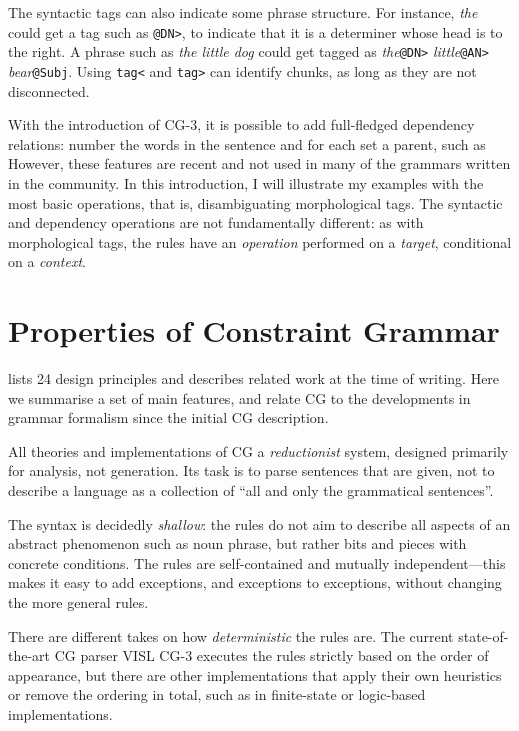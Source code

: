 The syntactic tags can also indicate some phrase structure. For
instance, \emph{the} could get a tag such as
\texttt{@DN\textgreater}, to indicate that it is a determiner whose
head is to the right. A phrase such as \emph{the little dog} could get
tagged as  \emph{the}\texttt{@DN>} \emph{little}\texttt{@AN>}
\emph{bear}\texttt{@Subj}.
 Using \texttt{tag\textless} and \texttt{tag\textgreater} can identify
chunks, as long as they are not disconnected.

With the introduction of CG-3, it is possible to add full-fledged dependency
relations: number the words in the sentence and for each set a parent,
such as %
However, these features are recent and not used in many of the grammars written 
in the community. In this introduction, I will illustrate my examples with the 
most basic operations, that is, disambiguating morphological tags.
The syntactic and dependency operations are not fundamentally
different: as with morphological tags, the rules have an \emph{operation}
performed on a \emph{target}, conditional on a \emph{context}.




\section{Properties of Constraint Grammar}\label{properties}

\cite{karlsson1995constraint} lists 24 design principles and describes
related work at the time of writing.
Here we summarise a set of main features, and relate CG to the developments in grammar formalism since the initial CG description.

All theories and implementations of CG  a \emph{reductionist}
system, designed primarily for analysis, not generation.
Its task is to parse sentences that are given, not to describe a language
as a collection of ``all and only the grammatical sentences''.

The syntax is decidedly \emph{shallow}: the rules do not aim to
describe all aspects of an abstract phenomenon such as noun phrase, 
but rather bits and pieces with concrete conditions.
The rules are self-contained and mutually independent---this makes it 
easy to add exceptions, and exceptions to exceptions, without 
changing the more general rules.

There are different takes on how \emph{deterministic} the rules are.
The current state-of-the-art CG parser VISL CG-3 executes the rules strictly based on the order of appearance, but there
are other implementations that apply their own heuristics or remove the
ordering in total, such as in finite-state or logic-based implementations. 

